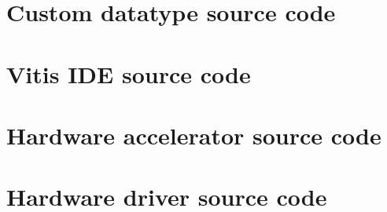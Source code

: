 \documentclass[11pt]{report}
\begin{document}
\begin{appendices}
        \begin{singlespace}
            
        \end{singlespace}
       
     \chapter{Custom datatype source code}
        \begin{singlespace}
            
        \end{singlespace} 
        
        \chapter{Vitis IDE source code}   
        
         \begin{singlespace}
            
        \end{singlespace} 
        
      \chapter{Hardware accelerator source code}
        \begin{singlespace}
            
        \end{singlespace} 
   
        \chapter{Hardware driver source code}
                \begin{singlespace}
            
        \end{singlespace} 
        

\end{appendices}
\end{document}
